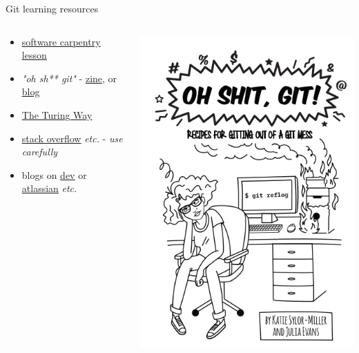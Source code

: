 \documentclass{beamer} %
\begin{document}
  \begin{frame}{Git learning resources}
  \begin{columns}
    \begin{column}{0.5\textwidth}
      \begin{itemize}
        \item \href{http://swcarpentry.github.io/git-novice/}{\underline{software carpentry lesson}}
        \item \textit{"oh sh** git"} - \href{https://wizardzines.com/zines/oh-shit-git/}{\underline{zine}}, or \href{https://ohshitgit.com/}{\underline{blog}}
        \item \href{https://the-turing-way.netlify.app/reproducible-research/vcs.html}{\underline{The Turing Way}}
        \item \href{https://stackoverflow.com/}{\underline{stack overflow}} \textit{etc.} - \textit{use carefully}
        \item blogs on \href{https://dev.to/}{\underline{dev}} or \href{https://www.atlassian.com/git/tutorials}{\underline{atlassian}} \textit{etc.}
      \end{itemize}
    \end{column}
    \begin{column}{0.5\textwidth}
      \includegraphics[height=0.8\textheight]{ohshitgit.png}
    \end{column}
  \end{columns}
  \end{frame}
\end{document}
